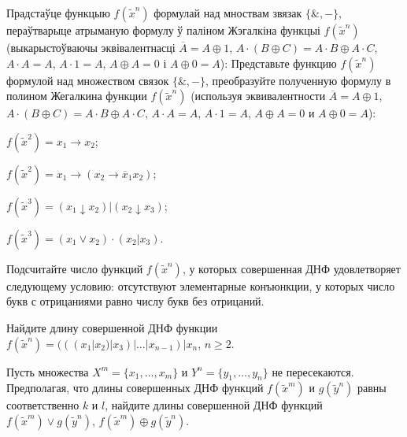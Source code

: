 \documentclass[12pt, a4paper]{article}
\begin{document}
\begin{problemList}
\problemItemWithCommonPart
{Прадстаўце функцыю $f(\tilde x^n)$ формулай над мноствам звязак $\{\&, -\}$,
пераўтварыце атрыманую формулу ў паліном Жэгалкіна функцыі $f(\tilde x^n)$
(выкарыстоўваючы эквівалентнасці $\overline{A}=A\oplus 1$, $A\cdot (B \oplus C)=A\cdot B\oplus A\cdot C$,
$A\cdot A=A$, $A\cdot 1 = A$, $A\oplus A=0$ і $A\oplus 0=A$):}
{Представьте функцию $f(\tilde x^n)$ формулой над множеством связок $\{\&, -\}$,
преобразуйте полученную формулу в полином Жегалкина функции $f(\tilde x^n)$
(используя эквивалентности $\overline{A}=A\oplus 1$, $A\cdot (B \oplus C)=A\cdot B\oplus A\cdot C$,
$A\cdot A=A$, $A\cdot 1 = A$, $A\oplus A=0$ и $A\oplus 0=A$):}
{%
\begin{belarusianEnumerateTwocol}
    \item $f(\tilde x^2)=x_1 \rightarrow x_2$;
    \item $f(\tilde x^2)=x_1 \rightarrow (x_2\rightarrow \overline{x}_1 x_2)$; 
    \item $f(\tilde x^3)=(x_1 \downarrow x_2)|(x_2 \downarrow x_3)$; 
    \item $f(\tilde x^3)=(x_1 \vee x_2)\cdot(x_2 | x_3)$.
\end{belarusianEnumerateTwocol}
}

\smallskip

{Подсчитайте число функций $f(\tilde x^n)$, у которых совершенная ДНФ удовлетворяет следующему условию:
отсутствуют элементарные конъюнкции, у которых число букв с отрицаниями равно числу букв без отрицаний.}

\bigskip

{Найдите длину совершенной ДНФ функции $f(\tilde x^n)=(((x_1|x_2)|x_3)|\ldots |x_{n-1})|x_n$, $n\ge 2$.}

\bigskip

{Пусть множества $X^m=\{x_1, \ldots, x_m\}$ и $Y^n=\{y_1, \ldots, y_n\}$ не пересекаются. Предполагая, что длины совершенных ДНФ функций $f(\tilde x^m)$ и $g(\tilde y^n)$ равны соответственно $k$ и $l$, найдите длины совершенной ДНФ функций $f(\tilde x^m)\vee g(\tilde y^n)$, $f(\tilde x^m)\oplus g(\tilde y^n)$.}


\end{problemList}
\end{document}
